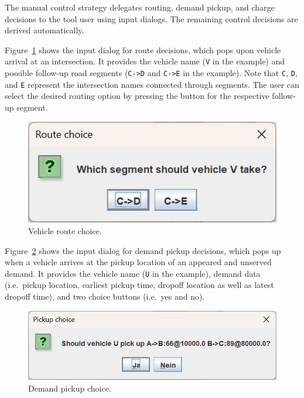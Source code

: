 \documentclass[a4paper,twoside]{article}
\begin{document}
	The manual control strategy delegates routing, demand pickup, and charge decisions to the tool user using input dialogs.
	The remaining control decisions are derived automatically.
	
	Figure~\ref{fig:manual-controller-route} shows the input dialog for route decisions, which pops upon vehicle arrival at an intersection.
	It provides the vehicle name (\texttt{V} in the example) and possible follow-up road segments (\texttt{C->D} and \texttt{C->E} in the example).
	Note that \texttt{C}, \texttt{D}, and \texttt{E} represent the intersection names connected through segments.
	The user can select the desired routing option by pressing the button for the respective follow-up segment.
	
	\begin{figure}[!ht]
		\centering
		\includegraphics[scale=0.3]{../../screenshots/manual-controller-route.png}
		\caption{Vehicle route choice.}
		\label{fig:manual-controller-route}
	\end{figure}
	
	Figure~\ref{fig:manual-controller-demand} shows the input dialog for demand pickup decisions, which pops up when a vehicle arrives at the pickup location of an appeared and unserved demand. It provides the vehicle name (\texttt{U} in the example), demand data (i.e.\ pickup location, earliest pickup time, dropoff location as well as latest dropoff time), and two choice buttons (i.e.\ yes and no).
	
	\begin{figure}[!ht]
		\centering
		\includegraphics[scale=0.3]{../../screenshots/manual-controller-demand.png}
		\caption{Demand pickup choice.}
		\label{fig:manual-controller-demand}
	\end{figure}
	
\end{document}
